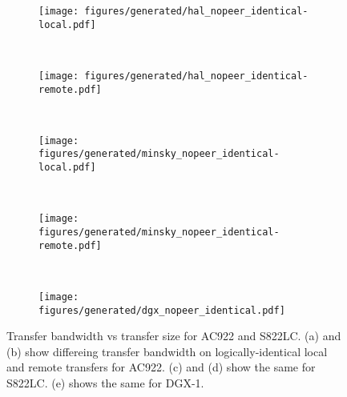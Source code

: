 \begin{figure}[ht]
	\centering
	\begin{subfigure}[b]{0.4\textwidth}
		\texttt{[image: figures/generated/hal\_nopeer\_identical-local.pdf]}
		\caption{}
		\label{fig:explicit-nopeer-identical-ac922-local}
	\end{subfigure}
	~
	\begin{subfigure}[b]{0.4\textwidth}
		\texttt{[image: figures/generated/hal\_nopeer\_identical-remote.pdf]}
		\caption{}
		\label{fig:explicit-nopeer-identical-ac922-remote}
	\end{subfigure}
	\\
	\begin{subfigure}[b]{0.4\textwidth}
		\texttt{[image: figures/generated/minsky\_nopeer\_identical-local.pdf]}
		\caption{}
		\label{fig:explicit-nopeer-identical-s822lc-local}
	\end{subfigure}
	~
	\begin{subfigure}[b]{0.4\textwidth}
		\texttt{[image: figures/generated/minsky\_nopeer\_identical-remote.pdf]}
		\caption{}
		\label{fig:explicit-nopeer-identical-s822lc-remote}
	\end{subfigure}
	\\
	\begin{subfigure}[b]{0.4\textwidth}
		\texttt{[image: figures/generated/dgx\_nopeer\_identical.pdf]}
		\caption{}
		\label{fig:explicit-nopeer-identical-dgx}
	\end{subfigure}
	\caption[]{
		Transfer bandwidth vs transfer size for AC922 and S822LC.
		(a) and (b) show differeing transfer bandwidth on logically-identical local and remote transfers for AC922.
		(c) and (d) show the same for S822LC.
		(e) shows the same for DGX-1.
	}
	\label{fig:explicit-nopeer-identical}
\end{figure}

